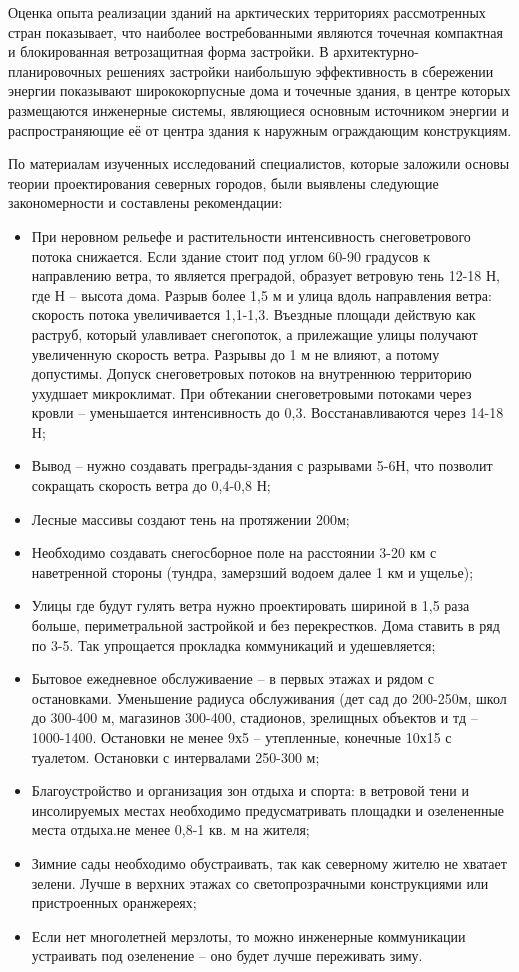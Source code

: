 Оценка опыта реализации зданий на арктических территориях рассмотренных стран показывает, что наиболее востребованными являются точечная компактная и блокированная ветрозащитная форма
застройки. В архитектурно-планировочных решениях застройки наибольшую эффективность в сбережении энергии показывают ширококорпусные дома
и точечные здания, в центре которых размещаются инженерные системы, являющиеся основным источником энергии и распространяющие её от центра здания
к наружным ограждающим конструкциям.


По материалам изученных исследований специалистов, которые заложили основы теории проектирования северных городов, были выявлены следующие закономерности и составлены рекомендации:
\begin{itemize}
    \item При неровном рельефе и растительности интенсивность снеговетрового потока снижается. Если здание стоит под углом 60-90 градусов к направлению ветра, то является преградой, образует ветровую тень 12-18 Н, где Н – высота дома. Разрыв более 1,5 м и улица вдоль направления ветра: скорость потока увеличивается 1,1-1,3. Въездные площади действую как раструб, который улавливает снегопоток, а прилежащие улицы получают увеличенную скорость ветра. Разрывы до 1 м не влияют, а потому допустимы. Допуск снеговетровых потоков на внутреннюю территорию ухудшает микроклимат. При обтекании снеговетровыми потоками через кровли – уменьшается интенсивность до 0,3. Восстанавливаются через 14-18 Н;
    \item Вывод – нужно создавать преграды-здания с разрывами 5-6Н, что позволит сокращать скорость ветра до 0,4-0,8 Н;
    \item Лесные массивы создают тень на протяжении 200м;
    \item Необходимо создавать снегосборное поле на расстоянии 3-20 км с наветренной стороны (тундра, замерзший водоем далее 1 км и ущелье);
    \item Улицы где будут гулять ветра нужно проектировать шириной в 1,5 раза больше, периметральной застройкой и без перекрестков. Дома ставить в ряд по 3-5. Так упрощается прокладка коммуникаций и удешевляется;
    \item Бытовое ежедневное обслуживаение – в первых этажах и рядом с остановками. Уменьшение радиуса обслуживания (дет сад до 200-250м, школ до 300-400 м, магазинов 300-400, стадионов, зрелищных объектов и тд – 1000-1400. Остановки не менее 9х5 – утепленные, конечные 10х15 с туалетом. Остановки с интервалами 250-300 м;
    \item Благоустройство и организация зон отдыха и спорта: в ветровой тени и инсолируемых местах необходимо предусматривать площадки и озелененные места отдыха.не менее 0,8-1 кв. м на жителя;
    \item Зимние сады необходимо обустраивать, так как северному жителю не хватает зелени. Лучше в верхних этажах со светопрозрачными конструкциями или пристроенных оранжереях;
    \item Если нет многолетней мерзлоты, то можно инженерные коммуникации устраивать под озеленение – оно будет лучше переживать зиму.
\end{itemize}


